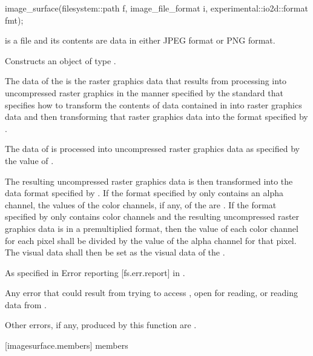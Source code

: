 \begin{itemdecl}
image_surface(filesystem::path f, image_file_format i,
  experimental::io2d::format fmt);
\end{itemdecl}
\begin{itemdescr}
\pnum
\requires
{} is a file and its contents are data in either JPEG format or PNG format.

\pnum
\effects
Constructs an object of type .

\pnum
The data of the \underlyingimagesurface is the raster graphics data that results from processing  into uncompressed raster graphics in the manner specified by the standard that specifies how to transform the contents of data contained in  into raster graphics data and then transforming that raster graphics data into the format specified by .

\pnum
The data of  is processed into uncompressed raster graphics data as specified by the value of .

\pnum
The resulting uncompressed raster graphics data is then transformed into the data format specified by . If the format specified by  only contains an alpha channel, the values of the color channels, if any, of the \underlyingimagesurface are \unspecnorm. If the format specified by  only contains color channels and the resulting uncompressed raster graphics data is in a premultiplied format, then the value of each color channel for each pixel shall be divided by the value of the alpha channel for that pixel. The visual data shall then be set as the visual data of the \underlyingimagesurface.

\pnum
\throws
As specified in Error reporting [fs.err.report] in \cppseventeen.

\pnum
\errors
Any error that could result from trying to access , open  for reading, or reading data from .

\pnum
Other errors, if any, produced by this function are .
\end{itemdescr}

 [imagesurface.members] { members}

